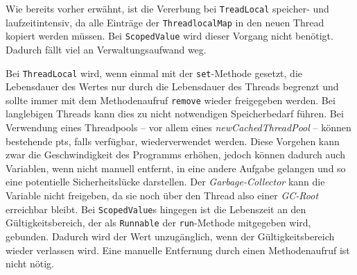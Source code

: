     Wie bereits vorher erwähnt, ist die Vererbung bei \texttt{TreadLocal} speicher- und laufzeitintensiv, da alle Einträge der \texttt{ThreadlocalMap} in den neuen Thread kopiert werden müssen.
    Bei \texttt{ScopedValue} wird dieser Vorgang nicht benötigt. Dadurch fällt viel an Verwaltungsaufwand weg. 

    Bei \texttt{ThreadLocal} wird, wenn einmal mit der \texttt{set}-Methode gesetzt, die Lebensdauer des Wertes nur durch die Lebensdauer des Threads begrenzt und sollte immer mit dem Methodenaufruf
    \texttt{remove} wieder freigegeben werden. Bei langlebigen Threads kann dies zu nicht notwendigen Speicherbedarf führen. Bei Verwendung eines Threadpools -- vor allem eines \emph{newCachedThreadPool} -- 
    können bestehende \Glspl{pt}, falls verfügbar, wiederverwendet werden. Diese Vorgehen kann zwar die Geschwindigkeit des Programms erhöhen, jedoch können dadurch auch Variablen,
    wenn nicht manuell entfernt, in eine andere Aufgabe gelangen und so eine potentielle Sicherheitslücke darstellen. Der \emph{Garbage-Collector} kann die Variable nicht freigeben, da sie noch über 
    den Thread also einer \emph{GC-Root} erreichbar bleibt. Bei \texttt{ScopedValue}s hingegen ist die Lebenszeit an den Gültigkeitsbereich, der als \texttt{Runnable} der \texttt{run}-Methode mitgegeben wird,
    gebunden. Dadurch wird der Wert unzugänglich, wenn der Gültigkeitsbereich wieder verlassen wird. Eine manuelle Entfernung durch einen Methodenaufruf ist nicht nötig.

